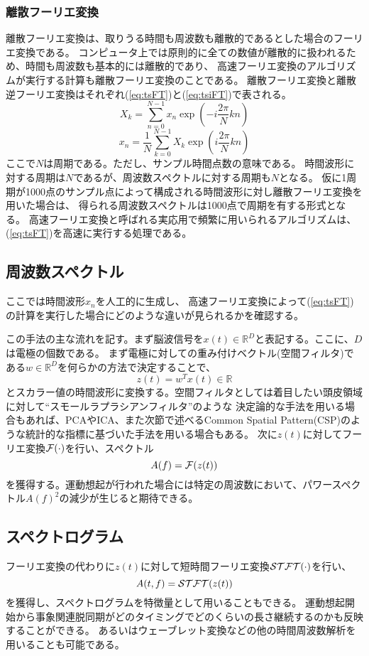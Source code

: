 \subsubsection{離散フーリエ変換}
離散フーリエ変換は、取りうる時間も周波数も離散的であるとした場合のフーリエ変換である。
コンピュータ上では原則的に全ての数値が離散的に扱われるため、時間も周波数も基本的には離散的であり、
高速フーリエ変換のアルゴリズムが実行する計算も離散フーリエ変換のことである。
離散フーリエ変換と離散逆フーリエ変換はそれぞれ(\ref{eq:tsFT})と(\ref{eq:tsiFT})で表される。
\begin{equation}
    X_k=\sum_{n = 0}^{N-1} x_n \exp \left(-i\frac{2\pi}{N} k n \right)
    \label{eq:tsFT}
\end{equation}
\begin{equation}
    x_n=\frac{1}{N}\sum_{k=0}^{N-1} X_k \exp \left(i \frac{2\pi}{N} k n \right)
    \label{eq:tsiFT}
\end{equation}
ここで\(N\)は周期である。ただし、サンプル時間点数の意味である。
時間波形に対する周期は\(N\)であるが、周波数スペクトルに対する周期も\(N\)となる。
仮に1周期が1000点のサンプル点によって構成される時間波形に対し離散フーリエ変換を用いた場合は、
得られる周波数スペクトルは1000点で周期を有する形式となる。
高速フーリエ変換と呼ばれる実応用で頻繁に用いられるアルゴリズムは、
(\ref{eq:tsFT})を高速に実行する処理である。

\subsection{周波数スペクトル}
ここでは時間波形\(x_n\)を人工的に生成し、
高速フーリエ変換によって(\ref{eq:tsFT})の計算を実行した場合にどのような違いが見られるかを確認する。


この手法の主な流れを記す。まず脳波信号を\(x(t) \in \mathbb{R}^D\)と表記する。ここに、\(D\)は電極の個数である。
まず電極に対しての重み付けベクトル(空間フィルタ)である$w \in \mathbb{R}^D$を何らかの方法で決定することで、
\begin{equation}
    z(t) = w^T x(t) \in \mathbb{R}    
\end{equation}
とスカラー値の時間波形に変換する。空間フィルタとしては着目したい頭皮領域に対して``スモールラプラシアンフィルタ''のような
決定論的な手法を用いる場合もあれば、PCAやICA、また次節で述べるCommon Spatial Pattern(CSP)のような統計的な指標に基づいた手法を用いる場合もある。
次に$z(t)$に対してフーリエ変換${\cal F}(\cdot)$を行い、スペクトル
\begin{equation}
    A(f) = {\cal F}(z(t))
\end{equation}
を獲得する。運動想起が行われた場合には特定の周波数において、パワースペクトル\(A(f)^2\)の減少が生じると期待できる。

\subsection{スペクトログラム}
フーリエ変換の代わりに$z(t)$に対して短時間フーリエ変換${\cal STFT}(\cdot)$を行い、
\begin{equation}
    A(t,f) = {\cal STFT}(z(t))
\end{equation}
を獲得し、スペクトログラムを特徴量として用いることもできる。
運動想起開始から事象関連脱同期がどのタイミングでどのくらいの長さ継続するのかも反映することができる。
あるいはウェーブレット変換などの他の時間周波数解析を用いることも可能である。